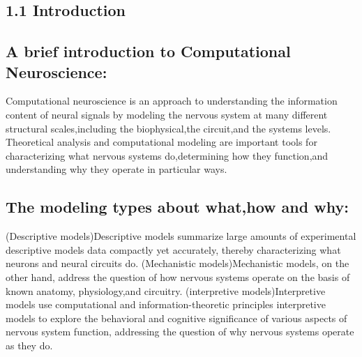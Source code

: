 \documentclass[letterpaper,oneside]{book}
\numberwithin{equation}{chapter}
\theoremstyle{definition}
\begin{document}
\begin{multicols}{2}
\setlength{\columnseprule}{0.2pt}
\section{1.1 Introduction}
\subsection{A brief introduction to Computational Neuroscience:}
\ntn Computational neuroscience is an approach to understanding the information content of neural signals by
modeling the nervous system at many different structural scales,including the biophysical,the circuit,and the systems levels.
\ntn Theoretical analysis and computational modeling are important tools for characterizing what nervous systems do,determining how they function,and understanding why they operate in particular ways.
\subsection{The modeling types about what,how and why:}
\ntn (Descriptive models)Descriptive models summarize large amounts of experimental descriptive models data compactly yet accurately, thereby characterizing what neurons and neural circuits do.
\ntn (Mechanistic models)Mechanistic models, on the other hand, address the question of how nervous systems operate on the basis of known anatomy, physiology,and circuitry.
\ntn (interpretive models)Interpretive models use computational and information-theoretic principles interpretive models to explore the behavioral and cognitive significance of various aspects of nervous system function, addressing the question of why nervous systems operate as they do.

\end{multicols}
\end{document}
